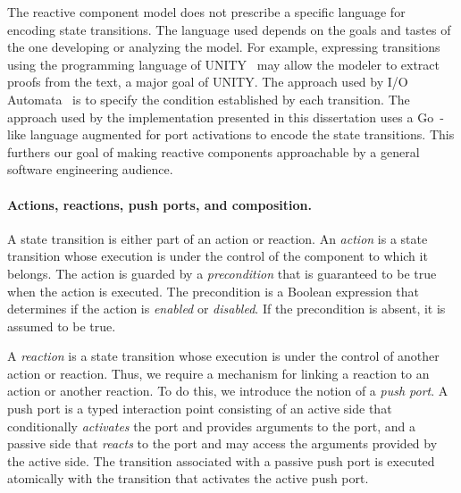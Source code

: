 The reactive component model does not prescribe a specific language for encoding state transitions.
The language used depends on the goals and tastes of the one developing or analyzing the model.
For example, expressing transitions using the programming language of UNITY~\cite{chandy1989parallel} may allow the modeler to extract proofs from the text, a major goal of UNITY.
The approach used by I/O Automata~\cite{nancy1996distributed} is to specify the condition established by each transition.
The approach used by the implementation presented in this dissertation uses a Go~\cite{go}-like language augmented for port activations to encode the state transitions.
This furthers our goal of making reactive components approachable by a general software engineering audience.

\paragraph{Actions, reactions, push ports, and composition.}
A state transition is either part of an action or reaction.
An \emph{action} is a state transition whose execution is under the control of the component to which it belongs.
The action is guarded by a \emph{precondition} that is guaranteed to be true when the action is executed.
The precondition is a Boolean expression that determines if the action is \emph{enabled} or \emph{disabled}.
If the precondition is absent, it is assumed to be true.

A \emph{reaction} is a state transition whose execution is under the control of another action or reaction.
Thus, we require a mechanism for linking a reaction to an action or another reaction.
To do this, we introduce the notion of a \emph{push port}.
A push port is a typed interaction point consisting of an active side that conditionally \emph{activates} the port and provides arguments to the port, and a passive side that \emph{reacts} to the port and may access the arguments provided by the active side.
The transition associated with a passive push port is executed atomically with the transition that activates the active push port.

